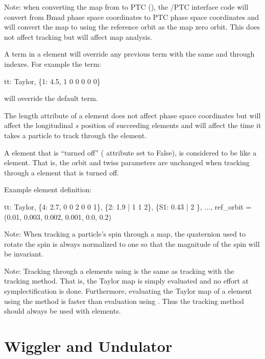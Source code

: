 {Note: when converting the map from \bmad to PTC (), the \bmad/PTC interface
code will convert from Bmad phase space coordinates to PTC phase space coordinates and
will convert the map to using the reference orbit as the map zero orbit. This does not
affect tracking but will affect map analysis.

A term in a  element will override any previous term
with the same  and  through  indexes. For example the term:
\begin{example}
  tt: Taylor, \{1: 4.5, 1 0 0 0 0 0\} 
\end{example}
will override the default  term.

The  length attribute of a  element does not affect phase space
coordinates but will affect the longitudinal $s$ position of succeeding elements and will
affect the time it takes a particle to track through the element.

A  element that is ``turned off'' ( attribute set to False), is
considered to be like a  element. That is, the orbit and twiss parameters are
unchanged when tracking through a  element that is turned off.

Example  element definition:
\begin{example}
  tt: Taylor, \{4:  2.7, 0 0 2 0 0 1\}, \{2:  1.9 | 1 1 2\},
              \{S1: 0.43 | 2 \}, ..., 
              ref_orbit = (0.01, 0.003, 0.002, 0.001, 0.0, 0.2)
\end{example}

Note: When tracking a particle's spin through a map, the quaternion used to rotate the spin is
always normalized to one so that the magnitude of the spin will be invariant. 

Note: Tracking through a  elements using  is the same as
tracking with the  tracking method.  That is, the Taylor map is simply
evaluated and no effort at symplectification is done. Furthermore, evaluating the Taylor
map of a  element using the  method is faster than evaluation using
. Thus the  tracking method should always be used with
 elements.


\section{Wiggler and Undulator} 
\label{s:wiggler}

}
